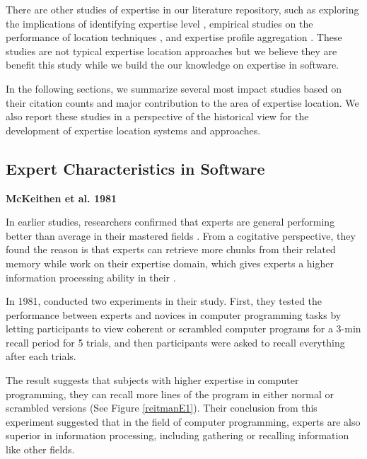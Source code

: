There are other studies of expertise in our literature repository, such as exploring the implications of identifying expertise level \cite{chevalier2003web, klas2010transparent, chan2016improving}, empirical studies on the performance of location techniques \cite{hannebauer2016automatically}, and expertise profile aggregation \cite{hiring2016sarma, saxena2017know}. These studies are not typical expertise location approaches but we believe they are benefit this study while we build the our knowledge on expertise in software.

In the following sections, we summarize several most impact studies based on their citation counts and major contribution to the area of expertise location. We also report these studies in a perspective of the historical view for the development of expertise location systems and approaches.

\subsection{Expert Characteristics in Software}

\textbf{McKeithen et al. 1981}

In earlier studies, researchers confirmed that experts are general performing better than average in their mastered fields \cite{chase1973perception, de2008thought, gobet1996recall, Simon:1996:SA:237774}. From a cogitative perspective, they found the reason is that experts can retrieve more chunks from their related memory while work on their expertise domain, which gives experts a higher information processing ability in their .

In 1981, \citeauthor{MCKEITHEN1981307} conducted two experiments in their study. First, they tested the performance between experts and novices in computer programming tasks by letting participants to view coherent or scrambled computer programs for a 3-min recall period for 5 trials, and then participants were asked to recall everything after each trials.

The result suggests that subjects with higher expertise in computer programming, they can recall more lines of the program in either normal or scrambled versions (See Figure \ref{reitmanE1}). Their conclusion from this experiment suggested that in the field of computer programming, experts are also superior in information processing, including gathering or recalling information like other fields.

